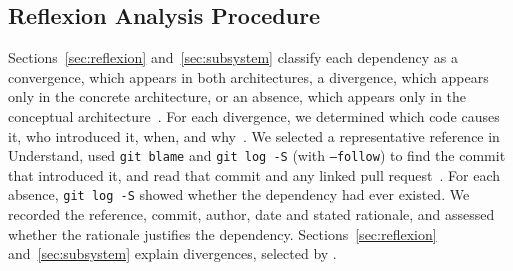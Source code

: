 \subsection{Reflexion Analysis Procedure}
\label{sec:reflexion-procedure}

Sections~\ref{sec:reflexion} and~\ref{sec:subsystem} classify each dependency as a convergence, which appears in both architectures, a divergence, which appears only in the concrete architecture, or an absence, which appears only in the conceptual architecture~\cite{reflexion-models}. For each divergence, we determined which code causes it, who introduced it, when, and why~\cite[slides 15--20]{reflexion-models}. We selected a representative reference in Understand, used \texttt{git blame} and \texttt{git log -S} (with \texttt{--follow}) to find the commit that introduced it, and read that commit and any linked pull request~\cite[slides 39--43]{reflexion-models}. For each absence, \texttt{git log -S} showed whether the dependency had ever existed. We recorded the reference, commit, author, date and stated rationale, and assessed whether the rationale justifies the dependency. Sections~\ref{sec:reflexion} and~\ref{sec:subsystem} explain  divergences, selected by .
